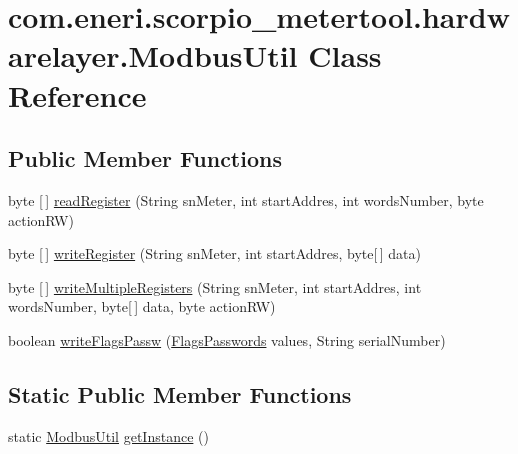 \hypertarget{classcom_1_1eneri_1_1scorpio__metertool_1_1hardwarelayer_1_1_modbus_util}{}\section{com.\+eneri.\+scorpio\+\_\+metertool.\+hardwarelayer.\+Modbus\+Util Class Reference}
\label{classcom_1_1eneri_1_1scorpio__metertool_1_1hardwarelayer_1_1_modbus_util}
\subsection*{Public Member Functions}
\begin{DoxyCompactItemize}
\item 
byte \mbox{[}$\,$\mbox{]} \hyperlink{classcom_1_1eneri_1_1scorpio__metertool_1_1hardwarelayer_1_1_modbus_util_ae6caa7cc6a332ab2b802c7f66664f910}{read\+Register} (String sn\+Meter, int start\+Addres, int words\+Number, byte action\+RW)
\item 
byte \mbox{[}$\,$\mbox{]} \hyperlink{classcom_1_1eneri_1_1scorpio__metertool_1_1hardwarelayer_1_1_modbus_util_aefabc1ccd027e7f65c6b8b046129a406}{write\+Register} (String sn\+Meter, int start\+Addres, byte\mbox{[}$\,$\mbox{]} data)
\item 
byte \mbox{[}$\,$\mbox{]} \hyperlink{classcom_1_1eneri_1_1scorpio__metertool_1_1hardwarelayer_1_1_modbus_util_a9cc4095b573fc38b8d16643d6ff32d17}{write\+Multiple\+Registers} (String sn\+Meter, int start\+Addres, int words\+Number, byte\mbox{[}$\,$\mbox{]} data, byte action\+RW)
\item 
boolean \hyperlink{classcom_1_1eneri_1_1scorpio__metertool_1_1hardwarelayer_1_1_modbus_util_a9652121a0a9836054d545eacc70226a9}{write\+Flags\+Passw} (\hyperlink{enumcom_1_1eneri_1_1scorpio__metertool_1_1hardwarelayer_1_1_flags_passwords}{Flags\+Passwords} values, String serial\+Number)
\end{DoxyCompactItemize}
\subsection*{Static Public Member Functions}
\begin{DoxyCompactItemize}
\item 
static \hyperlink{classcom_1_1eneri_1_1scorpio__metertool_1_1hardwarelayer_1_1_modbus_util}{Modbus\+Util} \hyperlink{classcom_1_1eneri_1_1scorpio__metertool_1_1hardwarelayer_1_1_modbus_util_a47a7f3d517e2a2b1cb85e5ef423118b6}{get\+Instance} ()
\end{DoxyCompactItemize}
